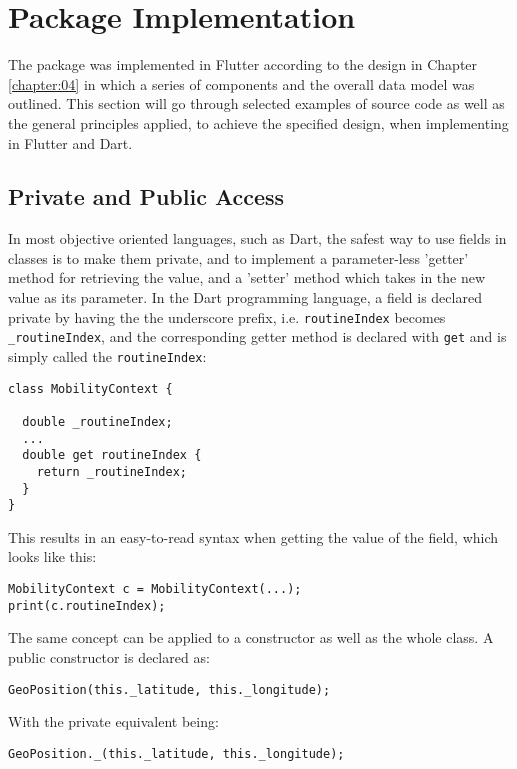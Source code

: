 \section{Package Implementation}
The package was implemented in Flutter according to the design in Chapter \ref{chapter:04} in which a series of components and the overall data model was outlined. This section will go through selected examples of source code as well as the general principles applied, to achieve the specified design, when implementing in Flutter and Dart.

\subsection{Private and Public Access}
In most objective oriented languages, such as Dart, the safest way to use fields in classes is to make them private, and to implement a parameter-less 'getter' method for retrieving the value, and a 'setter' method which takes in the new value as its parameter. In the Dart programming language, a field is declared private by having the the underscore prefix, i.e. \verb|routineIndex| becomes \verb|_routineIndex|, and the corresponding getter method is declared with \verb|get| and is simply called the \verb|routineIndex|:

\begin{verbatim}
class MobilityContext {

  double _routineIndex;
  ...
  double get routineIndex {
    return _routineIndex;
  }
}
\end{verbatim}

This results in an easy-to-read syntax when getting the value of the field, which looks like this:

\begin{verbatim}
MobilityContext c = MobilityContext(...);
print(c.routineIndex);
\end{verbatim}

The same concept can be applied to a constructor as well as the whole class. A public constructor is declared as:
\begin{verbatim}
GeoPosition(this._latitude, this._longitude);
\end{verbatim}

With the private equivalent being:

\begin{verbatim}
GeoPosition._(this._latitude, this._longitude);
\end{verbatim}

